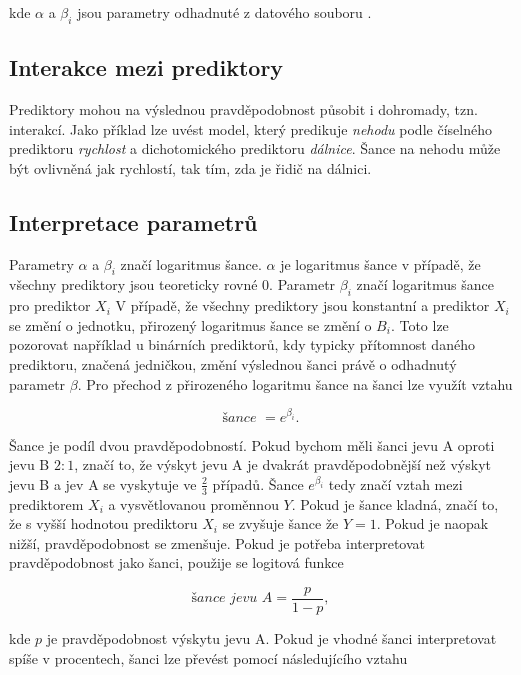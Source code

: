 kde $\alpha$ a $\beta_i$ jsou parametry odhadnuté z datového souboru \cite{kleinbaum_logistic_2010}.

\subsection{Interakce mezi prediktory}
Prediktory mohou na výslednou pravděpodobnost působit i dohromady, tzn. interakcí. Jako příklad lze uvést model, který predikuje \textit{nehodu} podle
číselného prediktoru \textit{rychlost} a dichotomického prediktoru \textit{dálnice}. Šance na nehodu může být ovlivněná jak rychlostí, tak tím, zda je 
řidič na dálnici. 


\subsection{Interpretace parametrů}
Parametry $\alpha$ a $\beta_i$ značí logaritmus šance. $\alpha$ je logaritmus šance v případě, že všechny prediktory
jsou teoreticky rovné $0$. Parametr $\beta_i$ značí logaritmus šance pro prediktor $X_i$
V případě, že všechny prediktory jsou konstantní a prediktor $X_i$ se změní o jednotku, přirozený logaritmus
šance se změní o $B_i$. Toto lze pozorovat například u binárních prediktorů, kdy typicky přítomnost
daného prediktoru, značená jedničkou, změní výslednou šanci právě o odhadnutý parametr $\beta$.
Pro přechod z přirozeného logaritmu šance na šanci lze využít vztahu

\begin{equation}
\textit{šance } = e^{\beta_i}.
\end{equation}

Šance je podíl dvou pravděpodobností. Pokud bychom měli šanci jevu A oproti jevu B $2 : 1$, značí to, že výskyt jevu A je dvakrát pravděpodobnější než
výskyt jevu B a jev A se vyskytuje ve $\frac{2}{3}$ případů. Šance $e^{\beta_i}$ tedy značí vztah mezi prediktorem $X_i$ a vysvětlovanou proměnnou $Y$. Pokud je
šance kladná, značí to, že s vyšší hodnotou prediktoru $X_i$ se zvyšuje šance že $Y = 1$. Pokud je naopak nižší, pravděpodobnost se zmenšuje. Pokud je potřeba
interpretovat pravděpodobnost jako šanci, použije se logitová funkce

\begin{equation}
    \label{eq:logitova_funkce}
    \textit{šance jevu A} = \frac{p}{1 - p},
\end{equation}

kde $p$ je pravděpodobnost výskytu jevu A. Pokud je vhodné šanci interpretovat spíše v procentech, šanci lze převést pomocí následujícího vztahu

